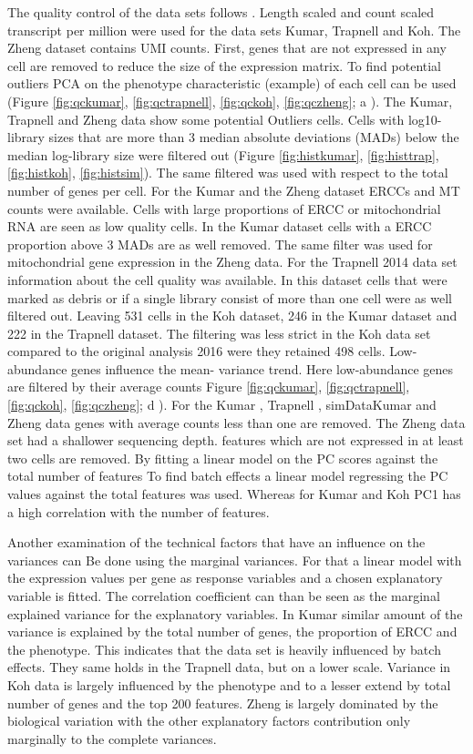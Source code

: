 \documentclass[11pt, a4paper]{article}\usepackage[]{graphicx}\usepackage[]{color}
\begin{document}
The quality control of the data sets follows \citep{lun2016step}.
Length scaled and count scaled transcript per million were used for the data sets Kumar, Trapnell and Koh. The Zheng dataset contains UMI counts. First, genes that are not expressed in any cell are removed to reduce the size of the expression matrix.
To find potential outliers PCA on the phenotype characteristic (example) of each cell can be used (Figure \ref{fig:qckumar}, \ref{fig:qctrapnell}, \ref{fig:qckoh}, \ref{fig:qczheng}; a ). The Kumar, Trapnell and Zheng data show some potential Outliers cells. 
Cells with log10-library sizes that are more than 3 median absolute deviations (MADs) below the median log-library size were filtered out (Figure \ref{fig:histkumar}, \ref{fig:histtrap}, \ref{fig:histkoh}, \ref{fig:histsim}). The same filtered was used with respect to the total number of genes per cell.  For the Kumar and the Zheng dataset ERCCs and MT counts were available. Cells with large proportions of ERCC or mitochondrial RNA are seen as low quality cells. In the Kumar dataset cells with a ERCC proportion above 3 MADs are as well removed. The same filter was used for mitochondrial gene expression in the Zheng data.
For the Trapnell 2014 data set information about the cell quality was available. In this dataset cells that were marked as debris or if a single library consist of more than one cell were as well filtered out. Leaving 531 cells in the Koh dataset, 246 in the Kumar dataset and 222 in the Trapnell dataset. The filtering was less strict in the Koh data set compared to the original analysis 2016 were they retained 498 cells. 
Low-abundance genes influence the mean- variance trend. Here low-abundance genes are filtered by their average counts Figure \ref{fig:qckumar}, \ref{fig:qctrapnell}, \ref{fig:qckoh}, \ref{fig:qczheng}; d ). For the Kumar , Trapnell , simDataKumar and Zheng data genes with average counts less than one are removed. The Zheng data set had a shallower sequencing depth. features which are not expressed in at least two cells are removed.
By fitting a linear model on the PC scores against the total number of features 
To find batch effects a linear model regressing the PC values against the total features was used\citet{lun2016step}. Whereas for Kumar and Koh PC1 has a high correlation with the number of features.

Another examination of the technical factors that have  an influence on the variances can Be done using the marginal variances. For that a linear model with the expression values per gene as response variables and a chosen  explanatory variable is fitted. The correlation coefficient can than be seen as the marginal explained variance for the explanatory variables.
In  Kumar similar amount  of the variance is explained by the total number of genes, the proportion of ERCC and the phenotype. This indicates that the data set is heavily influenced by batch effects. They same holds in the Trapnell data, but on a lower scale. Variance in Koh data is largely influenced by the phenotype and to a lesser extend by total number of genes and the top 200 features. 
Zheng is largely dominated by the biological variation with the other explanatory factors contribution only marginally to the complete variances.
\end{document}
